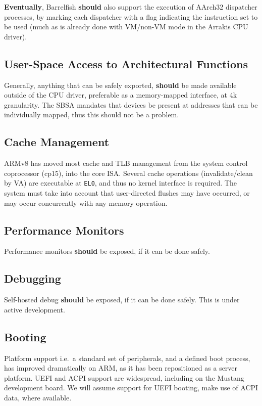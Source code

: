 \documentclass[a4paper,twoside]{report}
\begin{document}
\textbf{Eventually}, Barrelfish \textbf{should} also support the execution of
AArch32 dispatcher processes, by marking each dispatcher with a flag
indicating the instruction set to be used (much as is already done with
VM/non-VM mode in the Arrakis CPU driver).

\subsection{User-Space Access to Architectural Functions}

Generally, anything that can be safely exported, \textbf{should} be made
available outside of the CPU driver, preferable as a memory-mapped interface,
at 4k granularity. The SBSA mandates that devices be present at addresses that
can be individually mapped, thus this should not be a problem.

\subsection{Cache Management}

ARMv8 has moved most cache and TLB management from the system control
coprocessor (cp15), into the core ISA. Several cache operations
(invalidate/clean by VA) are executable at \texttt{EL0}, and thus no kernel
interface is required. The system must take into account that user-directed
flushes may have occurred, or may occur concurrently with any memory
operation.

\subsection{Performance Monitors}

Performance monitors \textbf{should} be exposed, if it can be done safely.

\subsection{Debugging}

Self-hosted debug \textbf{should} be exposed, if it can be done safely. This
is under active development.

\subsection{Booting}

Platform support i.e.~a standard set of peripherals, and a defined boot
process, has improved dramatically on ARM, as it has been repositioned as a
server platform. UEFI and ACPI support are widespread, including on the
Mustang development board. We will assume support for UEFI booting, make use
of ACPI data, where available.
\end{document}
